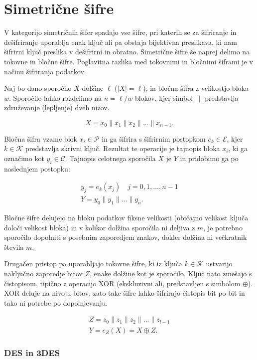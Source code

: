 \documentclass[12pt,a4paper,openany,tikz]{book}
\theoremstyle{plain}
\theoremstyle{definition}
\begin{document}
\section{Simetrične šifre}

V kategorijo simetričnih šifer spadajo vse šifre, pri katerih se za šifriranje in dešifriranje uporablja enak ključ ali pa obstaja bijektivna preslikava, ki nam šifrirni ključ preslika v dešifrirni in obratno. Simetrične šifre še naprej delimo na tokovne in bločne šifre. Poglavitna razlika med tokovnimi in bločnimi šiframi je v načinu šifriranja podatkov.

Naj bo dano sporočilo $X$ dolžine $\ell$ ($|X|=\ell$), in bločna šifra z velikostjo bloka $w$. Sporočilo lahko razdelimo na $n=\ell/w$ blokov, kjer simbol $\|$ predstavlja združevanje (lepljenje) dveh nizov.

$$
X=x_0 \| x_1 \| x_2 \| \dotsc \| x_{n-1}.
$$

Bločna šifra vzame blok $x_i \in \mathcal{P}$ in ga šifrira s šifrirnim postopkom $e_k \in \mathcal{E}$, kjer $k \in \mathcal{K}$ predstavlja skrivni ključ. Rezultat te operacije je tajnopis bloka $x_i$, ki ga označimo kot $y_i \in \mathcal{C}$. Tajnopis celotnega sporočila $X$ je $Y$ in pridobimo ga po naslednjem postopku:

\begin{gather*}
  y_j = e_k(x_j) \quad j=0,1,\dotsc,n-1\\
  Y = y_0 \| y_1 \| \dotsc \| y_n.
\end{gather*}

Bločne šifre delujejo na bloku podatkov fiksne velikosti (običajno velikost ključa določi velikost bloka) in v kolikor dolžina sporočila ni deljiva z $m$, je potrebno sporočilo dopolniti s posebnim zaporedjem znakov, dokler dolžina ni večkratnik števila $m$.

Drugačen pristop pa uporabljajo tokovne šifre, ki iz ključa $k \in \mathcal{K}$ ustvarijo naključno zaporedje bitov $Z$, enake dolžine kot je sporočilo. Ključ nato zmešajo s čistopisom, tipično z operacijo \rm{XOR} (ekskluzivni ali, predstavljen s simbolom $\oplus$). \rm{XOR} deluje na nivoju bitov, zato take šifre lahko šifrirajo čistopis bit po bit in tako ni potrebe po dopolnjevanju.

\begin{gather*}
Z=z_0 \| z_1 \| z_2 \| \dotsc \| z_{l-1} \\
Y=e_Z(X)= X \oplus Z.
\end{gather*}

\subsubsection{DES in 3DES}
\label{subs:DES in 3DES}
\end{document}
